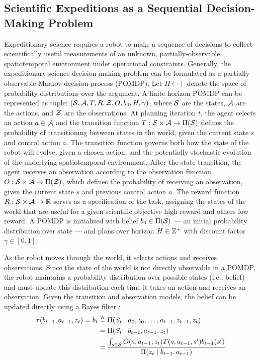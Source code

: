 \subsection{Scientific Expeditions as a Sequential Decision-Making Problem}
Expeditionary science requires a robot to make a sequence of decisions to collect scientifically useful measurements of an unknown, partially-observable spatiotemporal environment under operational constraints. Generally, the expeditionary science decision-making problem can be formulated as a partially observable Markov decision-process (POMDP). Let $\Pi(\cdot)$ denote the space of probability distributions over the argument. A finite horizon POMDP can be represented as tuple: $(\mathcal{S}, \mathcal{A}, T, R, \mathcal{Z}, O, b_0, H, \gamma)$, where $\mathcal{S}$ are the states, $\mathcal{A}$ are the actions, and $\mathcal{Z}$ are the observations. At planning iteration $t$, the agent selects an action $a \in \mathcal{A}$ and the transition function $T: \mathcal{S} \times \mathcal{A} \to \Pi(\mathcal{S})$ defines the probability of transitioning between states in the world, given the current state $s$ and control action $a$. The transition function governs both how the state of the robot will evolve, given a chosen action, and the potentially stochastic evolution of the underlying spatiotemporal environment. After the state transition, the agent receives an observation according to the observation function $O: \mathcal{S} \times \mathcal{A} \to \Pi(\mathcal{Z})$, which defines the probability of receiving an observation, given the current state $s$ and previous control action $a$. The reward function $R: \mathcal{S} \times \mathcal{A} \to \mathbb{R}$ serves as a specification of the task, assigning the states of the world that are useful for a given scientific objective high reward and others low reward. A POMDP is initialized with belief $b_0 \in \Pi(\mathcal{S})$ --- an initial probability distribution over state --- and plans over horizon $H \in \mathbb{Z}^+$ with discount factor $\gamma \in [0, 1]$.

As the robot moves through the world, it selects actions and receives observations. Since the state of the world is not directly observable in a POMDP, the robot maintains a probability distribution over possible states (i.e., belief) and must update this distribution each time it takes an action and receives an observation. Given the transition and observation models, the belief can be updated directly using a Bayes filter \autocite{sarkka2013bayesian}:
\begin{align}
    \tau(b_{t-1}, a_{t-1}, z_t) = b_t
        &\triangleq \Pi(S_t \mid a_0, z_0, \dots, a_{t-1}, z_{t-1}, z_t) \\
        &= \Pi(S_t \mid b_{t-1}, a_{t-1}, z_t) \\
        &= \frac{\int_{s \in \mathcal{S}} O(s, a_{t-1}, z_t) T(s, a_{t-1}, s')b_{t-1}(s')}{\Pi(z_t \mid b_{t-1}, a_{t-1})}
    \label{eq:bayes_tau}
\end{align}

